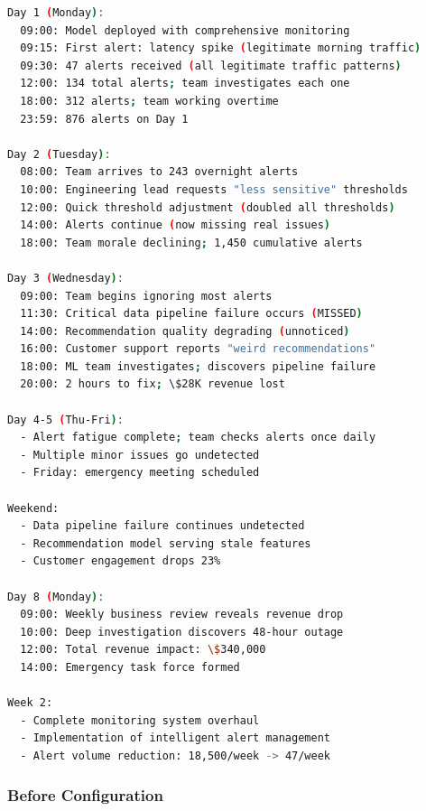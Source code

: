 \begin{lstlisting}[language=bash, caption={Alert Storm Crisis Timeline}]
Day 1 (Monday):
  09:00: Model deployed with comprehensive monitoring
  09:15: First alert: latency spike (legitimate morning traffic)
  09:30: 47 alerts received (all legitimate traffic patterns)
  12:00: 134 total alerts; team investigates each one
  18:00: 312 alerts; team working overtime
  23:59: 876 alerts on Day 1

Day 2 (Tuesday):
  08:00: Team arrives to 243 overnight alerts
  10:00: Engineering lead requests "less sensitive" thresholds
  12:00: Quick threshold adjustment (doubled all thresholds)
  14:00: Alerts continue (now missing real issues)
  18:00: Team morale declining; 1,450 cumulative alerts

Day 3 (Wednesday):
  09:00: Team begins ignoring most alerts
  11:30: Critical data pipeline failure occurs (MISSED)
  14:00: Recommendation quality degrading (unnoticed)
  16:00: Customer support reports "weird recommendations"
  18:00: ML team investigates; discovers pipeline failure
  20:00: 2 hours to fix; \$28K revenue lost

Day 4-5 (Thu-Fri):
  - Alert fatigue complete; team checks alerts once daily
  - Multiple minor issues go undetected
  - Friday: emergency meeting scheduled

Weekend:
  - Data pipeline failure continues undetected
  - Recommendation model serving stale features
  - Customer engagement drops 23%

Day 8 (Monday):
  09:00: Weekly business review reveals revenue drop
  10:00: Deep investigation discovers 48-hour outage
  12:00: Total revenue impact: \$340,000
  14:00: Emergency task force formed

Week 2:
  - Complete monitoring system overhaul
  - Implementation of intelligent alert management
  - Alert volume reduction: 18,500/week -> 47/week
\end{lstlisting}

\subsubsection{Before Configuration}

